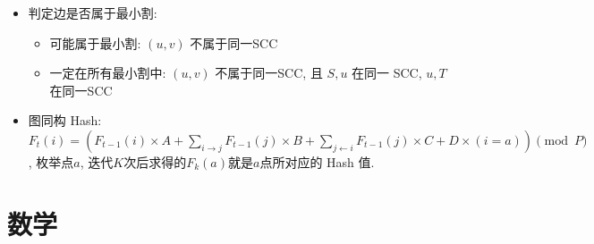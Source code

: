 \documentclass[landscape, twocolumn, 8pt, a4paper, twoside]{extarticle}
\begin{document}
\begin{spacing}{0.1}
\begin{itemize}
\begin{itemize}
  \end{itemize}
\item 判定边是否属于最小割:
  \begin{itemize}
  \item 可能属于最小割: $(u, v)$ 不属于同一SCC
  \item 一定在所有最小割中: $(u, v)$ 不属于同一SCC, 且 $S, u$ 在同一 SCC, $u, T$ 在同一SCC
  \end{itemize}
\item 图同构 Hash: $F_t(i) = (F_{t - 1}(i) \times A
  + \sum_{i \rightarrow j} F_{t - 1}(j) \times B
  + \sum_{j \leftarrow i} F_{t - 1}(j) \times C
  + D \times (i = a)
  ) \pmod{P}$, 枚举点$a$, 迭代$K$次后求得的$F_k(a)$就是$a$点所对应的 Hash 值. 
\end{itemize}

\section{数学}

\end{spacing}
\end{document}
